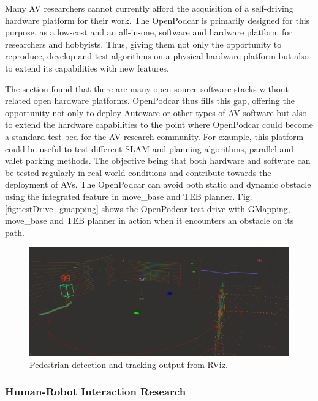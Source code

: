 \documentclass[a4paper]{article}
\begin{document}
	Many AV researchers cannot currently afford the acquisition of a self-driving hardware platform for their work. The OpenPodcar is primarily designed for this purpose, as a low-cost and an all-in-one, software and hardware platform for researchers and hobbyists. Thus, giving them not only the opportunity to reproduce, develop and test algorithms on a physical hardware platform but also to extend its capabilities with new features. 
	
	The  section found that there are many open source software stacks without related open hardware platforms.  OpenPodcar thus fills this gap, offering the opportunity not only to deploy Autoware or other types of AV software but also to extend the hardware capabilities to the point where OpenPodcar could become a standard test bed for the AV research community. For example, this platform could be useful to test different SLAM and planning algorithms, parallel and valet parking methods. The objective being that both hardware and software can be tested regularly in real-world conditions and contribute towards the deployment of AVs. The OpenPodcar can avoid both static and dynamic obstacle using the integrated feature in move\_base and TEB planner. Fig. \ref{fig:testDrive_gmapping} shows the OpenPodcar test drive with GMapping, move\_base and TEB planner in action when it encounters an obstacle on its path.     
	
	\begin{figure}
		\centering
		\includegraphics[width=0.7\columnwidth]{software/tracker.png}
		\caption{Pedestrian detection and tracking output from RViz.}
		\label{fig:detection_tracking}
	\end{figure}
	
	\subsubsection{Human-Robot Interaction Research}
	
\end{document}
